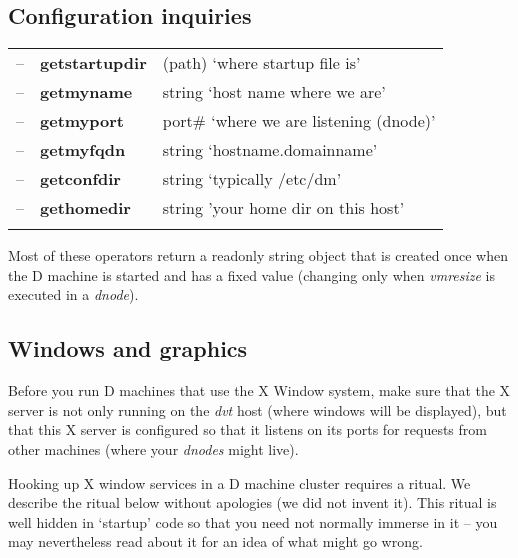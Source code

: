 \subsection{Configuration inquiries}\label{ssec:confops}

\begin{tabular}{>{\sffamily}r>{\sffamily\bfseries}l>{\sffamily}l}
-- & getstartupdir & (path) `where startup file is'\\
-- & getmyname     & string `host name where we are'\\
-- & getmyport     & port\# `where we are listening (dnode)'\\
-- & getmyfqdn     & string `hostname.domainname'\\
-- & getconfdir    & string `typically /etc/dm'\\
-- & gethomedir    & string 'your home dir on this host'\\\\
\end{tabular}



Most of these operators return a readonly string object that is
created once when the D machine is started and has a fixed value
(changing only when \emph{vmresize} is executed in a \emph{dnode}).

\subsection{Windows and graphics}\label{ssec:windows}

Before you run D machines that use the X Window system, make sure that the X server is not only running on the \emph{dvt} host (where windows will be displayed), but that this X server is configured so that it listens on its ports for requests from other machines (where your \emph{dnodes} might live).

Hooking up X window services in a D machine cluster requires a ritual. We describe the ritual below without apologies (we did not invent it). This ritual is well hidden in `startup' code so that you need not normally immerse in it -- you may nevertheless read about it for an idea of what might go wrong. \\ 
 

